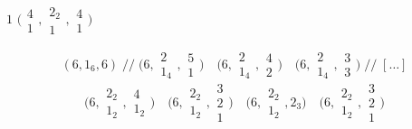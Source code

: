 \documentclass[11pt,a4paper]{article}
\begin{document}
 \quad $1$ \quad $\bigl(\begin{smallmatrix}4\\1\end{smallmatrix}, \begin{smallmatrix}2_2\\1\end{smallmatrix}, \begin{smallmatrix}4\\1\end{smallmatrix}\bigr)$

\[
  (6, 1_6, 6) \;/\!/\; \bigl(6, \begin{smallmatrix}2\\1_4\end{smallmatrix}, \begin{smallmatrix}5\\1\end{smallmatrix}\bigr) \quad
  \bigl(6, \begin{smallmatrix}2\\1_4\end{smallmatrix}, \begin{smallmatrix}4\\2\end{smallmatrix}\bigr) \quad
  \bigl(6, \begin{smallmatrix}2\\1_4\end{smallmatrix}, \begin{smallmatrix}3\\3\end{smallmatrix}\bigr) \;/\!/\; [\ldots]
\]
\[
  \bigl(6, \begin{smallmatrix}2_2\\1_2\end{smallmatrix}, \begin{smallmatrix}4\\1_2\end{smallmatrix}\bigr) \quad
  \bigl(6, \begin{smallmatrix}2_2\\1_2\end{smallmatrix}, \begin{smallmatrix}3\\2\\1\end{smallmatrix}\bigr) \quad
  \bigl(6, \begin{smallmatrix}2_2\\1_2\end{smallmatrix}, 2_3\bigr) \quad
  \bigl(6, \begin{smallmatrix}2_2\\1_2\end{smallmatrix}, \begin{smallmatrix}3\\2\\1\end{smallmatrix}\bigr)
\]
\end{document}
